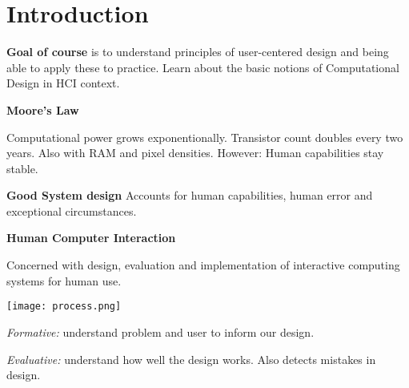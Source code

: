 \section{Introduction}

\textbf{Goal of course} is to understand principles of user-centered design and being able to apply these to practice.
Learn about the basic notions of Computational Design in HCI context. \medskip


\textbf{Moore's Law} \smallskip

Computational power grows exponentionally. Transistor count doubles every two years. Also with RAM and pixel densities. 
However: Human capabilities stay stable.\medskip

\textbf{Good System design} Accounts for human capabilities, human error and exceptional circumstances. \medskip

\textbf{Human Computer Interaction} \smallskip

Concerned with design, evaluation and implementation of interactive computing systems for human use. \medskip


\begin{center}
	\texttt{[image: process.png]}
\end{center}

\textit{Formative:} understand problem and user to inform our design. \medskip

\textit{Evaluative:} understand how well the design works. Also detects mistakes in design. \medskip

